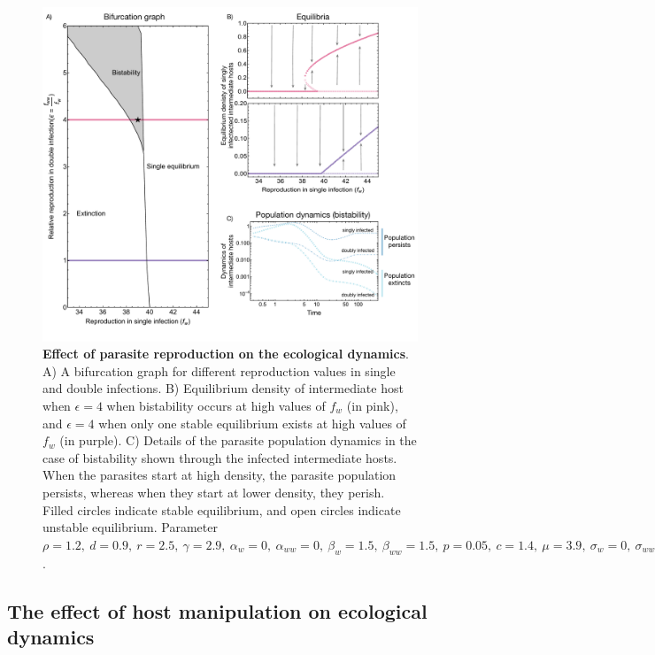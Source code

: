 \documentclass[a4paper]{scrartcl}
\begin{document}
\begin{figure}[!ht]
\captionsetup{format=plain}
\includegraphics[width = \textwidth]{Figures/reproduction_bifurcation2.pdf}
\caption{\textbf{Effect of parasite reproduction on the ecological dynamics}. 
A) A bifurcation graph for different reproduction values in single and double infections. 
B) Equilibrium density of intermediate host when $\epsilon = 4$ when bistability occurs at high values of $f_w$ (in pink), and $\epsilon = 4$ when only one stable equilibrium exists at high values of $f_w$ (in purple). 
C) Details of the parasite population dynamics in the case of bistability shown through the infected intermediate hosts. 
When the parasites start at high density, the parasite population persists, whereas when they start at lower density, they perish.
Filled circles indicate stable equilibrium, and open circles indicate unstable equilibrium. Parameter $\rho = 1.2, \  d = 0.9, \  r = 2.5, \ \gamma = 2.9, \ \alpha_w = 0, \ \alpha_{ww} =  0, \ \beta_w = 1.5, \ \beta_{ww} = 1.5, \ p = 0.05, \  c = 1.4, \ \mu = 3.9,  \ \sigma_w = 0, \ \sigma_{ww} = 0, \  q = 0.05, \ \delta = 0.9, \ k = 0.26, \ h = 0.6$.
}
\label{fig:bistability}
\end{figure}

\subsection*{The effect of host manipulation on ecological dynamics}
\end{document}
